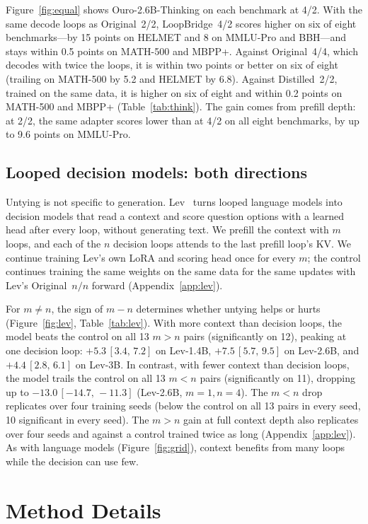 \documentclass[11pt]{article}
\newcommand{\ci}[2]{\,{\scriptsize\ensuremath{[#1,\,#2]}}}
\newcommand{\nat}[1]{Original~#1/#1}
\begin{document}
Figure~\ref{fig:equal} shows Ouro-2.6B-Thinking on each benchmark at 4/2. With the same decode loops as \nat{2},
LoopBridge~4/2 scores higher on six of eight benchmarks---by 15 points on HELMET and 8 on MMLU-Pro and BBH---and stays
within 0.5 points on MATH-500 and MBPP+. Against \nat{4}, which decodes with twice the loops, it is within two points or
better on six of eight (trailing on MATH-500 by 5.2 and HELMET by 6.8). Against Distilled~2/2, trained on the same data,
it is higher on six of eight and within 0.2 points on MATH-500 and MBPP+ (Table~\ref{tab:think}). The gain comes from
prefill depth: at 2/2, the same adapter scores lower than at 4/2 on all eight benchmarks, by up to 9.6 points on MMLU-Pro.

\subsection{Looped decision models: both directions}
\label{sec:lev}

Untying is not specific to generation. Lev~\citep{lev} turns looped language models into decision models that read a
context and score question options with a learned head after every loop, without generating text. We prefill the context
with $m$ loops, and each of the $n$ decision loops attends to the last prefill loop's KV. We continue training Lev's own
LoRA and scoring head once for every $m$; the control continues training the same weights on the same data for the same
updates with Lev's Original~$n/n$ forward (Appendix~\ref{app:lev}).

For $m\ne n$, the sign of $m-n$ determines whether untying helps or hurts (Figure~\ref{fig:lev}, Table~\ref{tab:lev}).
With more context than decision loops, the model beats the control on all 13 $m>n$ pairs (significantly on 12), peaking
at one decision loop: $+5.3$\ci{3.4}{7.2} on Lev-1.4B, $+7.5$\ci{5.7}{9.5} on Lev-2.6B, and $+4.4$\ci{2.8}{6.1} on Lev-3B.
In contrast, with fewer context than decision loops, the model trails the control on all 13 $m<n$ pairs (significantly on
11), dropping up to $-13.0$\ci{-14.7}{-11.3} (Lev-2.6B, $m=1, n=4$). The $m<n$ drop replicates over four training seeds
(below the control on all 13 pairs in every seed, 10 significant in every seed). The $m>n$ gain at full context depth
also replicates over four seeds and against a control trained twice as long (Appendix~\ref{app:lev}). As with language
models (Figure~\ref{fig:grid}), context benefits from many loops while the decision can use few.

\section{Method Details}
\label{app:method}
\end{document}
